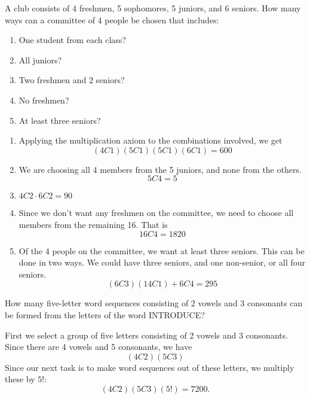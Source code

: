\begin{example}
    A club consists of 4 freshmen, 5 sophomores, 5 juniors, and 6 seniors. How many ways can a committee of 4 people be chosen that includes:
    \begin{enumerate}
        \item One student from each class?
        \item All juniors?
        \item Two freshmen and 2 seniors?
        \item No freshmen?
        \item At least three seniors?
    \end{enumerate}
\end{example}
\begin{solution}
    \begin{enumerate}
        \item Applying the multiplication axiom to the combinations involved, we get
              \[ (4C1)(5C1)(5C1)(6C1) = 600 \]
        \item We are choosing all 4 members from the 5 juniors, and none from the others.
              \[ 5C4 = 5 \]
        \item \( 4C2 \cdot 6C2 = 90 \)
        \item Since we don't want any freshmen on the committee, we need to choose all members from the remaining 16. That is
              \[ 16C4 = 1820 \]
        \item Of the 4 people on the committee, we want at least three seniors. This can be done in two ways. We could have three seniors, and one non-senior, or all four seniors.
              \[ (6C3)(14C1) + 6C4 = 295 \]
    \end{enumerate}
\end{solution}

\begin{example}
    How many five-letter word sequences consisting of 2 vowels and 3 consonants can be formed from the letters of the word INTRODUCE?
\end{example}
\begin{solution}
    First we select a group of five letters consisting of 2 vowels and 3 consonants. Since there are 4 vowels and 5 consonants, we have
    \[
        (4C2)(5C3)
    \]
    Since our next task is to make word sequences out of these letters, we multiply these by \(5!\):
    \[
        (4C2)(5C3)(5!) = 7200.
    \]
\end{solution}


